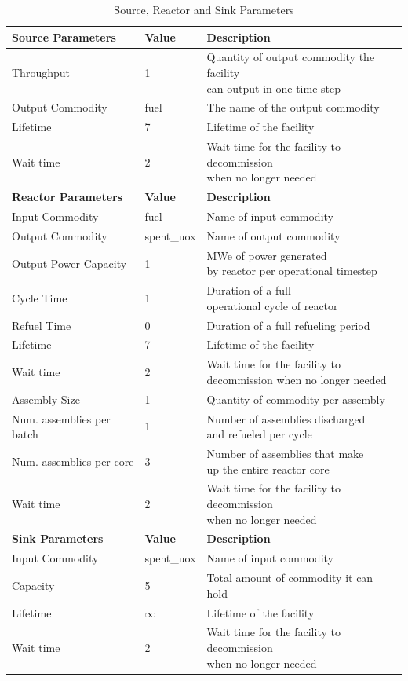 \documentclass[11pt,letterpaper]{article}
\begin{document}
\begin{table}[H]
	\centering
    \caption {Source, Reactor and Sink Parameters}
	\label{tab:reactor}
	\begin{tabular}{|l|l|l|}
\hline
\textbf{Source Parameters} & \textbf{Value} & \textbf{Description} \\
\hline
Throughput & 1 & \shortstack{Quantity of output commodity the facility \\can output in one time step} \\
Output Commodity & fuel & The name of the output commodity\\
Lifetime & 7 & Lifetime of the facility \\
Wait time & 2 & \shortstack{Wait time for the facility to decommission \\ when no longer needed }\\
\hline
\textbf{Reactor Parameters} & \textbf{Value} & \textbf{Description} \\
\hline
Input Commodity & fuel & Name of input commodity\\
Output Commodity & spent\_uox & Name of output commodity\\

Output Power Capacity & 1& \shortstack{MWe of power generated \\by reactor per operational timestep}\\
Cycle Time & 1 & \shortstack{Duration of a full \\ operational cycle of reactor}\\
Refuel Time & 0 & Duration of a full refueling period \\
Lifetime & 7 & Lifetime of the facility \\
Wait time & 2 & \shortstack{Wait time for the facility to\\ decommission when no longer needed} \\
Assembly Size & 1 & Quantity of commodity per assembly \\
Num. assemblies per batch & 1 & \shortstack{Number of assemblies discharged\\ and refueled per cycle}\\
Num. assemblies per core & 3 & \shortstack{Number of assemblies that make\\ up the entire reactor core} \\
Wait time & 2 & \shortstack{Wait time for the facility to decommission \\ when no longer needed }\\
\hline
\textbf{Sink Parameters} & \textbf{Value} & \textbf{Description} \\
\hline
Input Commodity & spent\_uox & Name of input commodity \\
Capacity & 5 & Total amount of commodity it can hold \\
Lifetime & $\infty$ & Lifetime of the facility \\

Wait time & 2 & \shortstack{Wait time for the facility to decommission \\ when no longer needed }\\
\hline
	\end{tabular}
\end{table}
\end{document}
